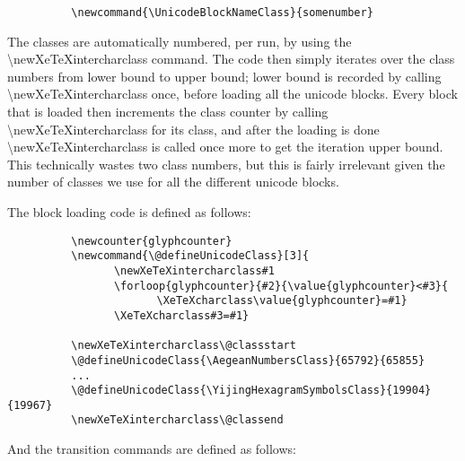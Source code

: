 ﻿\documentclass{article}
\begin{document}
		\disableTransitionRules
		\begin{verbatim}
　　　　　　\newcommand{\UnicodeBlockNameClass}{somenumber}
		\end{verbatim}
		\enableTransitionRules
		
		The classes are automatically numbered, per run, by using the \textbackslash newXeTeXintercharclass command. The code then simply iterates over the class numbers from lower bound to upper bound; lower bound is recorded by calling \textbackslash newXeTeXintercharclass once, before loading all the unicode blocks. Every block that is loaded then increments the class counter by calling \textbackslash newXeTeXintercharclass for its class, and after the loading is done \textbackslash newXeTeXintercharclass is called once more to get the iteration upper bound. This technically wastes two class numbers, but this is fairly irrelevant given the number of classes we use for all the different unicode blocks.
		
		The block loading code is defined as follows:
		
		\disableTransitionRules
		\begin{verbatim}
　　　　　　\newcounter{glyphcounter}
　　　　　　\newcommand{\@defineUnicodeClass}[3]{
　　　　　　　　　　\newXeTeXintercharclass#1
　　　　　　　　　　\forloop{glyphcounter}{#2}{\value{glyphcounter}<#3}{
　　　　　　　　　　　　　　\XeTeXcharclass\value{glyphcounter}=#1}
　　　　　　　　　　\XeTeXcharclass#3=#1}		

　　　　　　\newXeTeXintercharclass\@classstart
　　　　　　\@defineUnicodeClass{\AegeanNumbersClass}{65792}{65855}
　　　　　　...
　　　　　　\@defineUnicodeClass{\YijingHexagramSymbolsClass}{19904}{19967}
　　　　　　\newXeTeXintercharclass\@classend
		\end{verbatim}
		\enableTransitionRules

		And the transition commands are defined as follows:
\end{document}
